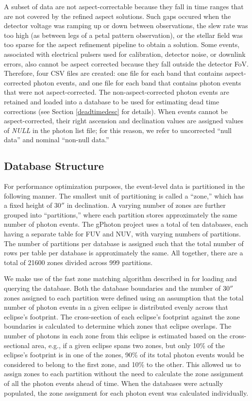 \documentclass[preprint]{aastex}
\begin{document}
A subset of data are not aspect-correctable because they fall in time ranges that are not covered by the refined aspect solutions. Such gaps occured when the detector voltage was ramping up or down between observations, the slew rate was too high (as between legs of a petal pattern observation), or the stellar field was too sparse for the aspect refinement pipeline to obtain a solution. Some events, associated with electrical pulsers used for calibration, detector noise, or downlink errors, also cannot be aspect corrected because they fall outside the detector FoV. Therefore, four CSV files are created: one file for each band that contains aspect-corrected photon events, and one file for each band that contains photon events that were not aspect-corrected. The non-aspect-corrected photon events are retained and loaded into a database to be used for estimating dead time corrections (see Section \ref{deadtimedesc} for details). When events cannot be aspect-corrected, their right ascension and declination values are assigned values of \emph{NULL} in the photon list file; for this reason, we refer to uncorrected ``null data'' and nominal ``non-null data.''

\subsection{Database Structure}
For performance optimization purposes, the event-level data is partitioned in the following manner.  The smallest unit of partitioning is called a ``zone,'' which has a fixed height of $30''$ in declination.  A varying number of zones are further grouped into ``partitions,'' where each partition stores approximately the same number of photon events. The gPhoton project uses a total of ten databases, each having a separate table for FUV and NUV, with varying numbers of partitions.  The number of partitions per database is assigned such that the total number of rows per table per database is approximately the same. All together, there are a total of 21600 zones divided across 999 partitions.

We make use of the fast zone matching algorithm described in \citet{gra2006} for loading and querying the database. Both the database boundaries and the number of $30''$ zones assigned to each partition were defined using an assumption that the total number of photon events in a given eclipse is distributed evenly across that eclipse's footprint. The cross-section of each eclipse's footprint against the zone boundaries is calculated to determine which zones that eclipse overlaps. The number of photons in each zone from this eclipse is estimated based on the cross-sectional area, e.g., if a given eclipse spans two zones, but only 10\% of the eclipse's footprint is in one of the zones, 90\% of its total photon events would be considered to belong to the first zone, and 10\% to the other. This allowed us to assign zones to each partition without the need to calculate the zone assignment of all the photon events ahead of time. When the databases were actually populated, the zone assignment for each photon event was calculated individually.
\end{document}
